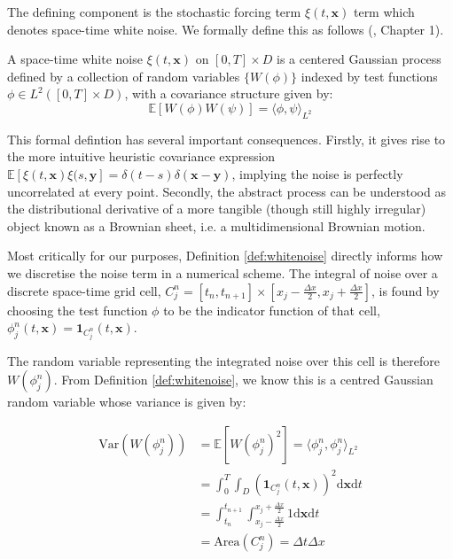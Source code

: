 The defining component is the stochastic forcing term $\xi(t,\mathbf{x})$ term which denotes 
space-time white noise. We formally define this as follows (\cite{walsh2006introduction}, Chapter 1).

\begin{definition}
\label{def:whitenoise}
A space-time white noise $\xi(t,\mathbf{x})$ on $[0,T] \times D$ is a centered
Gaussian process defined by a collection of random variables 
$\{W(\phi)\}$ indexed by test functions $\phi \in L^2([0,T] \times D)$, 
with a covariance structure given by:
\[
\mathbb{E}[W(\phi)W(\psi)] = \langle \phi, \psi \rangle_{L^2}
\]
\end{definition}

This formal defintion has several important consequences. Firstly, it gives rise 
to the more intuitive heuristic covariance expression 
$\mathbb{E}\left[\xi(t,\mathbf{x})\xi(s,\mathbf{y}\right] = 
\delta(t-s)\delta(\mathbf{x}-\mathbf{y})$, implying the noise is perfectly uncorrelated 
at every point. Secondly, the abstract process can be understood as the distributional
derivative of a more tangible (though still highly irregular) object
known as a Brownian sheet, i.e. a multidimensional Brownian motion.

Most critically for our purposes, Definition \ref{def:whitenoise} directly informs 
how we discretise the noise term in a numerical scheme. The integral of 
noise over a discrete space-time grid cell, $C_j^n = [t_n, t_{n+1}] \times
[x_j - \frac{\Delta x}{2}, x_j + \frac{\Delta x}{2}]$, is found by choosing the test
function $\phi$ to be the indicator function of that cell, $\phi_j^n(t, \mathbf{x}) 
= \mathbf{1}_{C_j^n}(t, \mathbf{x})$. 

The random variable representing the integrated noise over this cell is therefore 
$W(\phi_j^n)$. From Definition \ref{def:whitenoise}, we know this is a centred Gaussian 
random variable whose variance is given by:

\begin{subequations}\label{eq:white_noise_integral_derivation}
    \begin{align}
        \mathrm{Var}(W(\phi_j^n)) &= \mathbb{E}[W(\phi_j^n)^2] = 
        \langle \phi_j^n, \phi_j^n \rangle_{L^2} \\
        &= \int_0^T \int_D (\mathbf{1}_{C_j^n}(t, \mathbf{x}))^2 
        \mathrm{d}\mathbf{x} \mathrm{d}t \\
        &= \int_{t_n}^{t_{n+1}} \int_{x_j-\frac{\Delta x}{2}}^{x_j+\frac{\Delta x}{2}} 1
        \mathrm{d}\mathbf{x}\mathrm{d}t \\
        &= \text{Area}(C_j^n) = \Delta t \Delta x
    \end{align}
\end{subequations}


